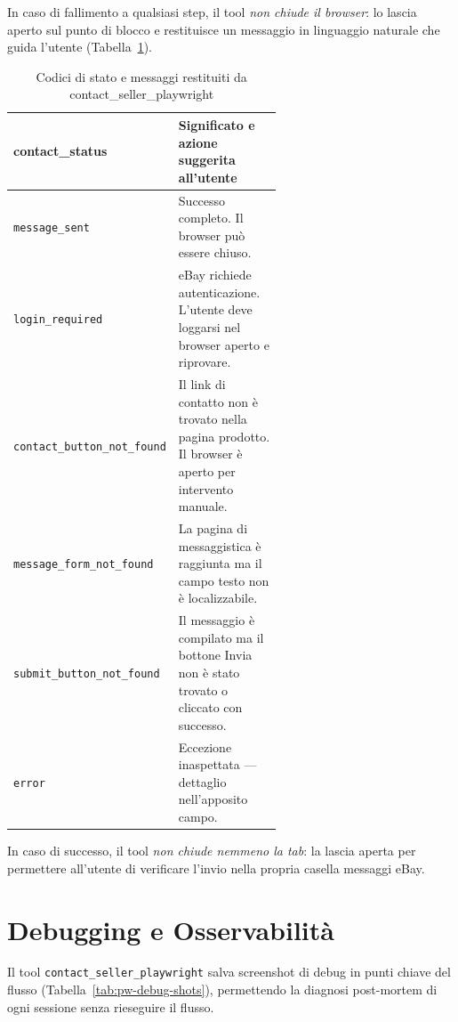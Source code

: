 In caso di fallimento a qualsiasi step, il tool \emph{non chiude il
browser}: lo lascia aperto sul punto di blocco e restituisce
un messaggio in linguaggio naturale che guida l'utente
(Tabella~\ref{tab:pw-contact-errors}).

\begin{table}[htbp]
\centering
\caption{Codici di stato e messaggi restituiti da contact\_seller\_playwright}
\label{tab:pw-contact-errors}
\begin{tabular}{lp{0.60\linewidth}}
\hline
\textbf{contact\_status} & \textbf{Significato e azione suggerita all'utente} \\
\hline
\texttt{message\_sent}            & Successo completo. Il browser può essere chiuso. \\
\texttt{login\_required}          & eBay richiede autenticazione. L'utente deve loggarsi nel browser aperto e riprovare. \\
\texttt{contact\_button\_not\_found} & Il link di contatto non è trovato nella pagina prodotto. Il browser è aperto per intervento manuale. \\
\texttt{message\_form\_not\_found}   & La pagina di messaggistica è raggiunta ma il campo testo non è localizzabile. \\
\texttt{submit\_button\_not\_found}  & Il messaggio è compilato ma il bottone Invia non è stato trovato o cliccato con successo. \\
\texttt{error}                    & Eccezione inaspettata — dettaglio nell'apposito campo. \\
\hline
\end{tabular}
\end{table}

In caso di successo, il tool \emph{non chiude nemmeno la tab}:
la lascia aperta per permettere all'utente di verificare l'invio
nella propria casella messaggi eBay.


\section{Debugging e Osservabilità}
\label{sec:pw-debug}

Il tool \texttt{contact\_seller\_playwright} salva screenshot di
debug in punti chiave del flusso (Tabella~\ref{tab:pw-debug-shots}),
permettendo la diagnosi post-mortem di ogni sessione senza rieseguire
il flusso.

